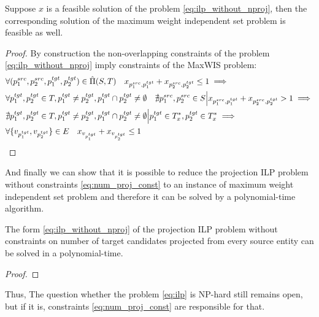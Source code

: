 \begin{lemma} \label{lemma:ilp_f_implies_maxis}
  Suppose \( x \) is a feasible solution of the problem \eqref{eq:ilp_without_nproj}, then
  the corresponding solution of the maximum weight independent set problem is feasible as well.
\end{lemma}
\begin{proof} By construction the non-overlapping constraints of the problem \eqref{eq:ilp_without_nproj}
  imply constraints of the MaxWIS problem:
  \begin{align*}
    & \forall (p_1^{src}, p_2^{src}, p_1^{tgt}, p_2^{tgt}) \in \hat{\Pi}(S, T) \quad
    x_{p_1^{src}, p_1^{tgt}} + x_{p_2^{src}, p_2^{tgt}} \leq 1 \implies                                                     \\
    & \forall p_1^{tgt}, p_2^{tgt} \in T, p_1^{tgt} \neq p_2^{tgt}, p_1^{tgt} \cap p_2^{tgt} \neq \emptyset
    \quad \nexists p_1^{src}, p_2^{src} \in S \Big|
    x_{p_1^{src}, p_1^{tgt}} + x_{p_2^{src}, p_2^{tgt}} > 1 \implies                                                     \\
    & \nexists p_1^{tgt}, p_2^{tgt} \in T, p_1^{tgt} \neq p_2^{tgt}, p_1^{tgt} \cap p_2^{tgt} \neq \emptyset \Big|
    p_1^{tgt} \in T^*_x, p_2^{tgt} \in T^*_x \implies                                                                    \\
    & \forall \{ v_{p_1^{tgt}}, v_{p_2^{tgt}} \} \in E \quad x_{v_{p_1^{tgt}}} + x_{v_{p_2^{tgt}}}\leq 1
  \end{align*}
\end{proof}

And finally we can show that it is possible to reduce the projection ILP problem without constraints \eqref{eq:num_proj_const}
to an instance of maximum weight independent set problem and therefore it can be solved by a polynomial-time algorithm.
\begin{theorem}
  The form \eqref{eq:ilp_without_nproj} of the projection ILP problem without constraints on number of target candidates projected from
  every source entity can be solved in a polynomial-time.
\end{theorem}
\begin{proof}

\end{proof}

Thus, The question whether the problem \eqref{eq:ilp} is NP-hard still remains open, but if it is,
constraints \eqref{eq:num_proj_const} are responsible for that.

